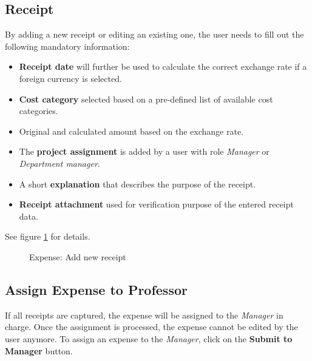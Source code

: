 \subsection{Receipt}
\label{sec:addreceipt}
By adding a new receipt or editing an existing one, the user needs to fill out the following mandatory information:
\begin{itemize}
    \item \textbf{Receipt date} will further be used to calculate the correct exchange rate if a foreign currency is selected.
    \item \textbf{Cost category} selected based on a pre-defined list of available cost categories.
    \item Original and calculated amount based on the exchange rate.
    \item The \textbf{project assignment} is added by a user with role \textit{Manager} or \textit{Department manager}.
    \item A short \textbf{explanation} that describes the purpose of the receipt.
    \item \textbf{Receipt attachment} used for verification purpose of the entered receipt data.
\end{itemize}

See figure \ref{fig:expenses-add01} for details.


\begin{figure}[H]
    \centering
    \caption{Expense: Add new receipt}
    \label{fig:expenses-add01}
\end{figure}

\subsection{Assign Expense to Professor}
If all receipts are captured, the expense will be assigned to the \textit{Manager} in charge. Once the assignment is processed, the expense cannot be edited by the user anymore. To assign an expense to the \textit{Manager}, click on the \textbf{Submit to Manager} button.

